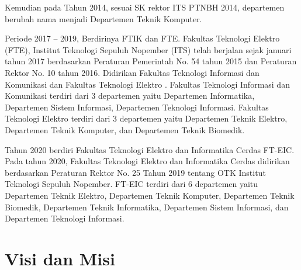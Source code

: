Kemudian pada Tahun 2014, sesuai SK rektor ITS PTNBH 2014, departemen berubah nama menjadi Departemen Teknik Komputer.

Periode 2017 – 2019, Berdirinya FTIK dan FTE. Fakultas Teknologi Elektro (FTE), Institut Teknologi Sepuluh Nopember (ITS) telah berjalan sejak januari tahun 2017 berdasarkan Peraturan Pemerintah No. 54 tahun 2015 dan Peraturan Rektor No. 10 tahun 2016. Didirikan Fakultas Teknologi Informasi dan Komunikasi dan Fakultas Teknologi Elektro . Fakultas Teknologi Informasi dan Komunikasi terdiri dari 3 departemen yaitu Departemen Informatika, Departemen Sistem Informasi, Departemen Teknologi Informasi. Fakultas Teknologi Elektro terdiri dari 3 departemen yaitu Departemen Teknik Elektro, Departemen Teknik Komputer, dan Departemen Teknik Biomedik.

Tahun 2020 berdiri Fakultas Teknologi Elektro dan Informatika Cerdas FT-EIC. Pada tahun 2020, Fakultas Teknologi Elektro dan Informatika Cerdas didirikan berdasarkan Peraturan Rektor No. 25 Tahun 2019 tentang OTK Institut Teknologi Sepuluh Nopember. FT-EIC terdiri dari 6 departemen yaitu Departemen Teknik Elektro, Departemen Teknik Komputer, Departemen Teknik Biomedik, Departemen Teknik Informatika, Departemen Sistem Informasi, dan Departemen Teknologi Informasi.

\section{Visi dan Misi}

